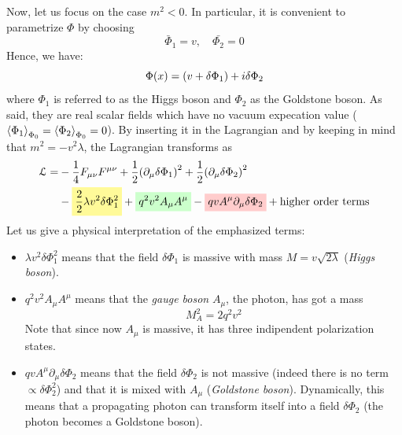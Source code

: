 \documentclass[../main/main.tex]{subfiles}
\begin{document}
Now, let us focus on  the case \( m^2<0 \). In particular, it is convenient to parametrize \( \Phi  \) by choosing
\begin{equation*}
  \bar{\Phi }_1 = v , \quad \bar{\Phi _2} = 0
\end{equation*}
Hence, we have:
\begin{equation*}
  \Phi (x) = \qty(v + \delta \Phi _1) + i \delta \Phi _2
\end{equation*}
where \( \Phi _1 \) is referred to as the Higgs boson and \( \Phi _2 \) as the Goldstone boson. As said, they are real scalar fields which have no vacuum expecation value (\( \expval{\Phi _1}_{\Phi _0} = \expval{\Phi _2}_{\Phi _0} = 0   \)).
By inserting it in the Lagrangian and by keeping in mind that \(  m^2 = -v^2 \lambda  \), the Lagrangian transforms as
\begin{equation}
\begin{split}
  \mathcal{L} = & - \frac{1}{4} F_ {\mu \nu }F ^{\mu \nu } + \frac{1}{2} \qty(\partial_ \mu \delta \Phi _1 )^2 + \frac{1}{2} \qty(\partial _ \mu \delta \Phi _2 )^2    \\
  & -\mathcolorbox{yellow!40}{\frac{2}{2} \lambda v^2 \delta \Phi _1 ^2} + \mathcolorbox{green!20}{q^2 v^2 A_{\mu } A ^{\mu }} - \mathcolorbox{red!20}{q v A ^{\mu } \partial_ \mu \delta \Phi _2} + \text{higher order terms}
\end{split}
\label{eq:n_9}
\end{equation}
Let us give a physical interpretation of the emphasized terms:
\begin{itemize}
\item \( \lambda v^2 \delta \Phi _1^2 \) means that the field \( \delta \Phi _1 \) is massive with mass \( M = v \sqrt{2 \lambda }  \)  (\emph{Higgs boson}).

\item \( q^2 v^2 A_ \mu A ^\mu  \) means that the \emph{gauge boson}  \( A _ \mu  \), the photon, has got a mass
\begin{equation*}
  M_A^2 = 2 q^2 v^2
\end{equation*}
Note that since now \( A _ \mu  \) is massive, it has three indipendent polarization states.

\item \( q v A ^ \mu  \partial _ \mu  \delta \Phi _2  \) means that the field \( \delta \Phi _2 \) is not massive (indeed there is no term \( \propto \delta \Phi _2^2 \)) and that it is mixed with \( A_ \mu  \) (\emph{Goldstone boson}). Dynamically, this means that a propagating photon can transform itself into a field \( \delta \Phi _2 \) (the photon becomes a Goldstone boson).

\end{itemize}
\end{document}
